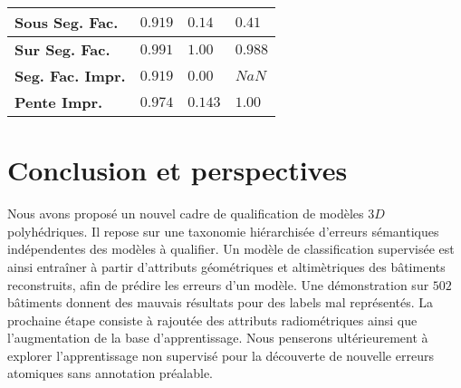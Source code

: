 \documentclass[a4paper,french]{article}
\begin{document}
{\begin{table}[H]
\begin{minipage}{.46\linewidth}
\begin{center}
\begin{tabular}{x{2.5cm} x{1cm} x{1cm} x{1cm}}
                        \textbf{Sous Seg. Fac.} & $0.919$ & $0.14$ & $0.41$ \\
                        \midrule
                        \textbf{Sur Seg. Fac.} & $0.991$ & $1.00$ & $0.988$ \\
                        \midrule
                        \textbf{Seg. Fac. Impr.} & $0.919$ & $0.00$ & $NaN$\\
                        \midrule
                        \textbf{Pente Impr.} & $0.974$ & $0.143$ & $1.00$\\
                        \bottomrule
                    \end{tabular}
                \end{center}
            \end{minipage}
        \end{table}
    }

    \section{Conclusion et perspectives}

    Nous avons proposé un nouvel cadre de qualification de modèles $3D$ polyhédriques. Il repose sur une taxonomie hiérarchisée d'erreurs sémantiques indépendentes des modèles à qualifier. Un modèle de classification supervisée est ainsi entraîner à partir d'attributs géométriques et altimètriques des bâtiments reconstruits, afin de prédire les erreurs d'un modèle. Une démonstration sur $502$ bâtiments donnent des mauvais résultats pour des labels mal représentés. La prochaine étape consiste à rajoutée des attributs radiométriques ainsi que l'augmentation de la base d'apprentissage. Nous penserons ultérieurement à explorer l'apprentissage non supervisé pour la découverte de nouvelle erreurs atomiques sans annotation préalable.

    
    
\end{document}
